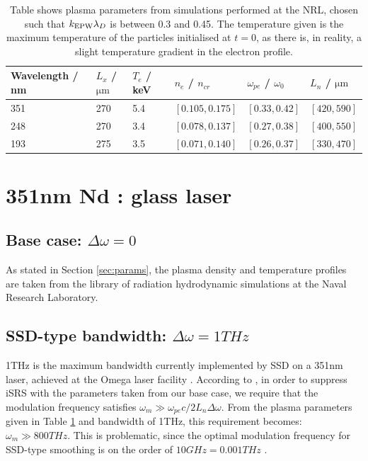 \begin{table}[h]
\begin{center}

\begin{tabular}{|l|l|l|l|l|l|}
\hline
Wavelength / nm & $L_x$ /$\si{\micro\metre}$ & $T_e$ / keV & $n_e$ / $n_{cr}$ & $\omega_{pe}$ / $\omega_0$ & $L_n$ / $\si{\micro\metre}$
\\ \hline 
351 & 270 & 5.4 & $[0.105,0.175]$ & $[0.33,0.42]$ & $[420,590]$ \\ \hline
248 & 270 & 3.4 & $[0.078,0.137]$ & $[0.27,0.38]$ & $[400,550]$ \\ \hline
193 & 275 & 3.5 & $[0.071,0.140]$ & $[0.26,0.37]$ & $[330,470]$ \\ \hline

\end{tabular}

\end{center}
\caption{Table shows plasma parameters from simulations performed at the NRL, chosen such that $k_\mathrm{EPW}\lambda_D$ is between 0.3 and 0.45. The temperature given is the maximum temperature of the particles initialised at $t=0$, as there is, in reality, a slight temperature gradient in the electron profile.}
\label{tab:plasma}
\end{table}




\section{351nm Nd : glass laser}\label{sec:351}

\subsection{Base case: $\Delta\omega=0$}
As stated in Section \ref{sec:params}, the plasma density and temperature profiles are taken from the library of radiation hydrodynamic simulations at the Naval Research Laboratory. 

\subsection{SSD-type bandwidth: $\Delta\omega=1\si{THz}$}
1THz is the maximum bandwidth currently implemented by SSD on a 351nm laser, achieved at the Omega laser facility \citep{Regan2005}. According to \citet{Wen2021}, in order to suppress iSRS with the parameters taken from our base case, we require that the modulation frequency satisfies $\omega_m \gg \omega_{pe} c / 2L_n\Delta\omega$. From the plasma parameters given in Table \ref{tab:plasma} and bandwidth of 1THz, this requirement becomes: $\omega_m \gg 800 \si{THz}$. This is problematic, since the optimal modulation frequency for SSD-type smoothing is on the order of $10 \si{GHz} = 0.001 \si{THz}$ \citep{Regan2005,Kelly2013}.

